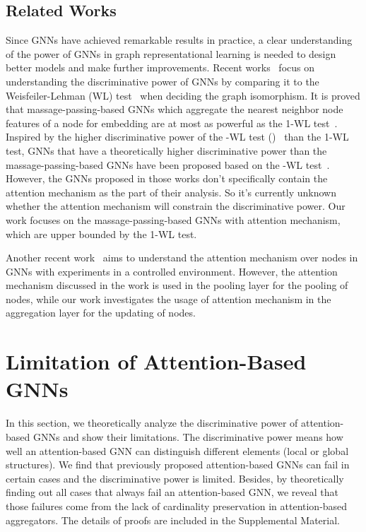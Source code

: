 \documentclass[letterpaper]{article} \usepackage{aaai20}  \usepackage{times}  \usepackage{helvet} \usepackage{courier}  \usepackage[hyphens]{url}  \usepackage{graphicx} \urlstyle{rm} \def\UrlFont{\rm}  \usepackage{graphicx}  \frenchspacing  \setlength{\pdfpagewidth}{8.5in}  \setlength{\pdfpageheight}{11in}
\theoremstyle{plain}
\theoremstyle{definition}
\begin{document}
\subsection{Related Works}
Since GNNs have achieved remarkable results in practice, a clear understanding of the power of GNNs in graph representational learning is needed to design better models and make further improvements. Recent works~\cite{morris2019weisfeiler,xu2018how,maron2019provably} focus on understanding the discriminative power of GNNs by comparing it to the Weisfeiler-Lehman (WL) test~\cite{weisfeiler1968reduction} when deciding the graph isomorphism. It is proved that massage-passing-based GNNs which aggregate the nearest neighbor node features of a node for embedding are at most as powerful as the 1-WL test~\cite{xu2018how}. Inspired by the higher discriminative power of the -WL test ()~\cite{cai1992optimal} than the 1-WL test, GNNs that have a theoretically higher discriminative power than the massage-passing-based GNNs have been proposed based on the -WL test~\cite{morris2019weisfeiler,maron2019provably}. However, the GNNs proposed in those works don't specifically contain the attention mechanism as the part of their analysis. So it's currently unknown whether the attention mechanism will constrain the discriminative power. Our work focuses on the massage-passing-based GNNs with attention mechanism, which are upper bounded by the 1-WL test.

Another recent work~\cite{knyazev2019understanding} aims to understand the attention mechanism over nodes in GNNs with experiments in a controlled environment. However, the attention mechanism discussed in the work is used in the pooling layer for the pooling of nodes, while our work investigates the usage of attention mechanism in the aggregation layer for the updating of nodes.

\section{Limitation of Attention-Based GNNs}
In this section, we theoretically analyze the discriminative power of attention-based GNNs and show their limitations. The discriminative power means how well an attention-based GNN can distinguish different elements (local or global structures). We find that previously proposed attention-based GNNs can fail in certain cases and the discriminative power is limited. Besides, by theoretically finding out all cases that always fail an attention-based GNN, we reveal that those failures come from the lack of cardinality preservation in attention-based aggregators. The details of proofs are included in the Supplemental Material.
\end{document}
